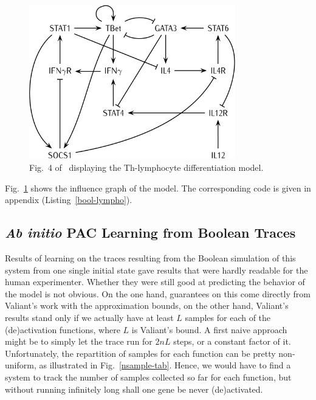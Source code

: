 \documentclass{llncs}
\begin{document}
\begin{figure}[htbp]
   \centering
   \includegraphics[width=0.8\textwidth]{th_net_clean.png}
   \caption{Fig.~4 of~\cite{RRMTC06tcsb} displaying the Th-lymphocyte
   differentiation model.\label{fig:lympho}}
\end{figure}

Fig.~\ref{fig:lympho} shows the influence graph of the model. The
corresponding code is given in appendix (Listing~\ref{bool-lympho}).

\subsection{\emph{Ab initio} PAC Learning from Boolean Traces}
\label{sec:abinitio}

Results of learning on the traces resulting from the Boolean simulation of this system from one single initial state gave results that were hardly readable for the human experimenter. Whether they were still good at predicting the behavior of the model is not obvious. On the one hand, guarantees on this come directly from Valiant's work with the approximation bounds, on the other hand,  
Valiant's results stand only if we actually have at least $L$ samples for each of the (de)activation functions, where $L$ is Valiant's bound. A first naive approach might be to simply let the trace run for $2nL$ steps, or a constant factor of it. Unfortunately, the repartition of samples for each function can be pretty non-uniform, as illustrated in Fig.~\ref{nsample-tab}. Hence, we would have to find a system to track the number of samples collected so far for each function, but without running infinitely long shall one gene be never (de)activated.

\end{document}
